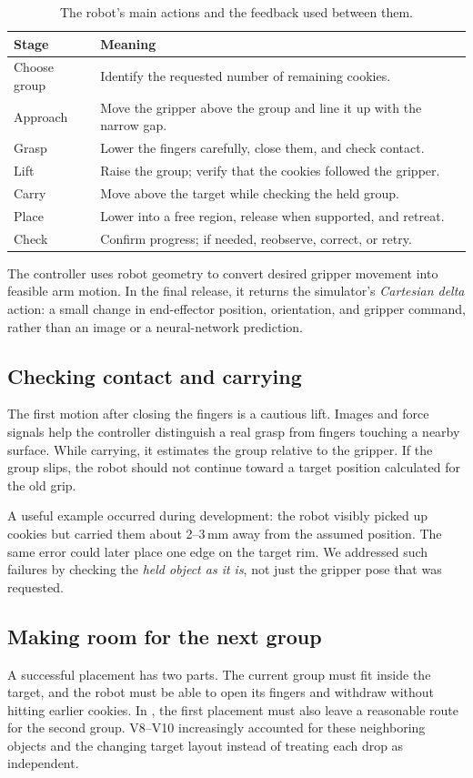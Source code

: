 \begin{table}[t]
\centering\small
\caption{The robot's main actions and the feedback used between them.}
\label{tab:stages}
\begin{tabular}{p{1.6cm}p{5.65cm}}
\toprule
Stage & Meaning \\
\midrule
Choose group & Identify the requested number of remaining cookies. \\
Approach & Move the gripper above the group and line it up with the narrow gap. \\
Grasp & Lower the fingers carefully, close them, and check contact. \\
Lift & Raise the group; verify that the cookies followed the gripper. \\
Carry & Move above the target while checking the held group. \\
Place & Lower into a free region, release when supported, and retreat. \\
Check & Confirm progress; if needed, reobserve, correct, or retry. \\
\bottomrule
\end{tabular}
\end{table}

The controller uses robot geometry to convert desired gripper movement into feasible arm motion. In the final release, it returns the simulator's \emph{Cartesian delta} action: a small change in end-effector position, orientation, and gripper command, rather than an image or a neural-network prediction.

\subsection{Checking contact and carrying}
The first motion after closing the fingers is a cautious lift. Images and force signals help the controller distinguish a real grasp from fingers touching a nearby surface. While carrying, it estimates the group relative to the gripper. If the group slips, the robot should not continue toward a target position calculated for the old grip.

A useful example occurred during development: the robot visibly picked up cookies but carried them about 2--3\,mm away from the assumed position. The same error could later place one edge on the target rim. We addressed such failures by checking the \emph{held object as it is}, not just the gripper pose that was requested.

\subsection{Making room for the next group}
A successful placement has two parts. The current group must fit inside the target, and the robot must be able to open its fingers and withdraw without hitting earlier cookies. In \pTen, the first placement must also leave a reasonable route for the second group. V8--V10 increasingly accounted for these neighboring objects and the changing target layout instead of treating each drop as independent.

